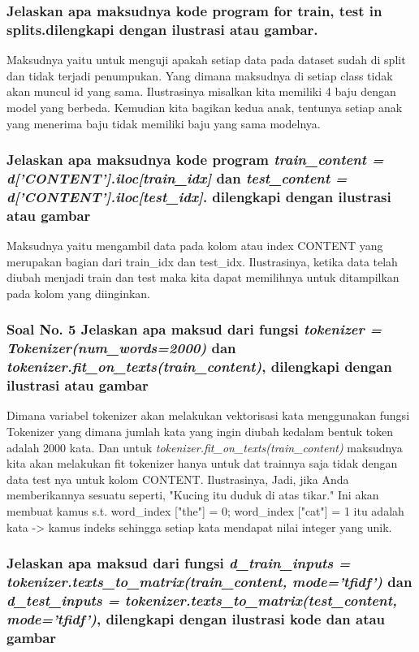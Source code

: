 \subsubsection{Jelaskan apa maksudnya kode program for train, test in splits.dilengkapi dengan ilustrasi atau gambar.} 
Maksudnya yaitu untuk menguji apakah setiap data pada dataset sudah di split dan tidak terjadi penumpukan. Yang dimana maksudnya di setiap class tidak akan muncul id yang sama. Ilustrasinya misalkan kita memiliki 4 baju dengan model yang berbeda. Kemudian kita bagikan kedua anak, tentunya setiap anak yang menerima baju tidak memiliki baju yang sama modelnya.

\subsubsection{Jelaskan apa maksudnya kode program \emph{train\_content = d['CONTENT'].iloc[train\_idx]} dan \emph{test\_content = d['CONTENT'].iloc[test\_idx]}. dilengkapi dengan ilustrasi atau gambar}

Maksudnya yaitu mengambil data pada kolom atau index CONTENT yang merupakan bagian dari train\_idx dan test\_idx. Ilustrasinya, ketika data telah diubah menjadi train dan test maka kita dapat memilihnya untuk ditampilkan pada kolom yang diinginkan.

\subsubsection{Soal No. 5 Jelaskan apa maksud dari fungsi \emph{tokenizer = Tokenizer(num\_words=2000)} dan \emph{tokenizer.fit\_on\_texts(train\_content)}, dilengkapi dengan ilustrasi atau gambar} 
Dimana variabel tokenizer akan melakukan vektorisasi kata menggunakan fungsi Tokenizer yang dimana jumlah kata yang ingin diubah kedalam bentuk token adalah 2000 kata. Dan untuk \emph{tokenizer.fit\_on\_texts(train\_content)} maksudnya kita akan melakukan fit tokenizer hanya untuk dat trainnya saja tidak dengan data test nya untuk kolom CONTENT. Ilustrasinya, Jadi, jika Anda memberikannya sesuatu seperti, "Kucing itu duduk di atas tikar." Ini akan membuat kamus s.t. word\_index ["the"] = 0; word\_index ["cat"] = 1 itu adalah kata -> kamus indeks sehingga setiap kata mendapat nilai integer yang unik.

\subsubsection{Jelaskan apa maksud dari fungsi \emph{d\_train\_inputs = tokenizer.texts\_to\_matrix(train\_content, mode='tfidf')} dan \emph{d\_test\_inputs = tokenizer.texts\_to\_matrix(test\_content, mode='tfidf')}, dilengkapi dengan ilustrasi kode dan atau gambar} 


